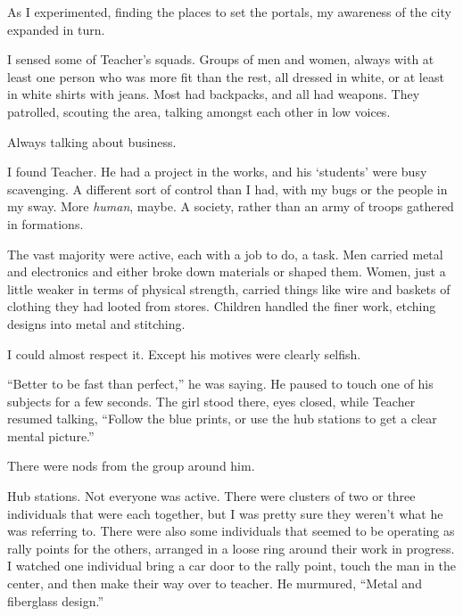 As I experimented, finding the places to set the portals, my awareness of the city expanded in turn.



I sensed some of Teacher's squads.  Groups of men and women, always with at least one person who was more fit than the rest, all dressed in white, or at least in white shirts with jeans.  Most had backpacks, and all had weapons.  They patrolled, scouting the area, talking amongst each other in low voices.



Always talking about business.



I found Teacher.  He had a project in the works, and his `students' were busy scavenging.  A different sort of control than I had, with my bugs or the people in my sway.  More \emph{human}, maybe.  A society, rather than an army of troops gathered in formations.



The vast majority were active, each with a job to do, a task.  Men carried metal and electronics and either broke down materials or shaped them.  Women, just a little weaker in terms of physical strength, carried things like wire and baskets of clothing they had looted from stores.  Children handled the finer work, etching designs into metal and stitching.



I could almost respect it.  Except his motives were clearly selfish.



``Better to be fast than perfect,'' he was saying.  He paused to touch one of his subjects for a few seconds.  The girl stood there, eyes closed, while Teacher resumed talking, ``Follow the blue prints, or use the hub stations to get a clear mental picture.''



There were nods from the group around him.



Hub stations.  Not everyone was active.  There were clusters of two or three individuals that were each together, but I was pretty sure they weren't what he was referring to.  There were also some individuals that seemed to be operating as rally points for the others, arranged in a loose ring around their work in progress.  I watched one individual bring a car door to the rally point, touch the man in the center, and then make their way over to teacher.  He murmured, ``Metal and fiberglass design.''



